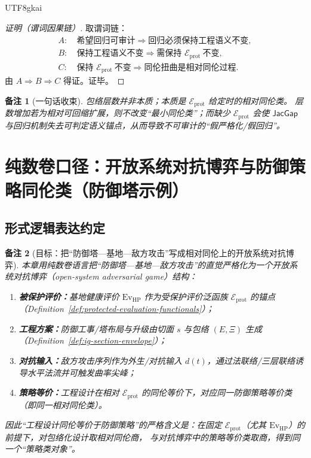\documentclass[12pt]{article}
\newtheorem{remark}{备注}[section]
\newcommand{\JacGap}{\ensuremath{\mathsf{JacGap}}}
\begin{document}
\begin{CJK*}{UTF8}{gkai}
\begin{proof}[证明（谓词因果链）]
取谓词链：
\[
\begin{aligned}
A:&\ \text{希望回归可审计}\Rightarrow \text{回归必须保持工程语义不变},\\
B:&\ \text{保持工程语义不变}\Rightarrow \text{需保持 }\mathcal{E}_{\mathrm{prot}}\ \text{不变},\\
C:&\ \text{保持 }\mathcal{E}_{\mathrm{prot}}\ \text{不变}\Rightarrow \text{同伦扭曲是相对同伦过程}.
\end{aligned}
\]
由 $A\Rightarrow B\Rightarrow C$ 得证。证毕。
\end{proof}

\begin{remark}[一句话收束]
包络层数并非本质；本质是 $\mathcal{E}_{\mathrm{prot}}$ 给定时的相对同伦类。
层数增加若为相对可回缩扩展，则不改变“最小同伦类”；而缺少 $\mathcal{E}_{\mathrm{prot}}$ 会使 $\JacGap$ 与回归机制失去可判定语义锚点，从而导致不可审计的“假严格化/假回归”。
\end{remark}

\clearpage
\section{纯数卷口径：开放系统对抗博弈与防御策略同伦类（防御塔示例）}
\label{sec:puremath-open-system-adversarial-game}

\subsection{形式逻辑表达约定}

\begin{remark}[目标：把“防御塔—基地—敌方攻击”写成相对同伦上的开放系统对抗博弈]
本章用纯数卷语言把“防御塔—基地—敌方攻击”的直觉严格化为一个开放系统对抗博弈（open-system adversarial game）结构：
\begin{enumerate}
  \item \textbf{被保护评价：}基地健康评价 $\mathrm{Ev}_{\mathrm{HP}}$ 作为受保护评价泛函族 $\mathcal{E}_{\mathrm{prot}}$
    的锚点（Definition~\ref{def:protected-evaluation-functionals}）；
  \item \textbf{工程方案：}防御工事/塔布局与升级由切面 $s$ 与包络 $(E,\Xi)$ 生成（Definition~\ref{def:ig-section-envelope}）；
  \item \textbf{对抗输入：}敌方攻击序列作为外生/对抗输入 $d(t)$，通过法联络/三层联络诱导水平法流并可触发曲率尖峰；
  \item \textbf{策略等价：}工程设计在相对 $\mathcal{E}_{\mathrm{prot}}$ 的同伦等价下，对应同一防御策略等价类（即同一相对同伦类）。
\end{enumerate}
因此“工程设计同伦等价于防御策略”的严格含义是：在固定 $\mathcal{E}_{\mathrm{prot}}$（尤其 $\mathrm{Ev}_{\mathrm{HP}}$）的前提下，对包络化设计取相对同伦商，
  与对抗博弈中的策略等价类取商，得到同一个“策略类对象”。
\end{remark}


\end{CJK*}
\end{document}
